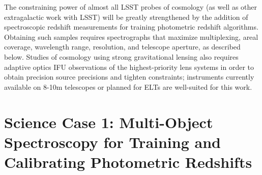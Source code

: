 \documentclass[12pt]{report}
\begin{document}
The constraining power of almost all LSST probes of cosmology (as well as other extragalactic work with LSST) will be greatly strengthened by the addition of spectroscopic redshift measurements for training photometric redshift algorithms.  Obtaining such samples requires spectrographs that maximize multiplexing, areal coverage, wavelength range, resolution, and telescope aperture, as described below.  Studies of cosmology using strong gravitational lensing also requires adaptive optics IFU observations of the highest-priority lens systems in order to obtain precision source precisions and tighten constraints; instruments currently available on 8-10m telescopes or planned for ELTs are well-suited for this work.


%
%


\section{Science Case 1: Multi-Object Spectroscopy for Training and Calibrating Photometric Redshifts}
\end{document}
